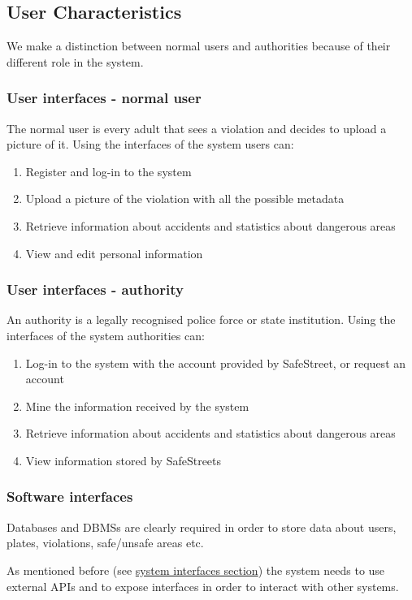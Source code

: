 \subsection{User Characteristics}
	We make a distinction between normal users and authorities because of their different role in the system. 
	\subsubsection{User interfaces - normal user}
	The normal user is every adult that sees a violation and decides to upload a picture of it.
	Using the interfaces of the system users can:
	\begin{enumerate}
		\item Register and log-in to the system
		\item Upload a picture of the violation with all the possible metadata
		\item Retrieve information about accidents and statistics about dangerous areas
		\item View and edit personal information
	\end{enumerate}
	
	\subsubsection{User interfaces - authority}
		An authority is a legally recognised police force or state institution.
		Using the interfaces of the system authorities can:
		\begin{enumerate}
			\item Log-in to the system with the account provided by SafeStreet, or request an account
			\item Mine the information received by the system
			\item Retrieve information about accidents and statistics about dangerous areas
			\item View information stored by SafeStreets
		\end{enumerate}
	
\subsubsection{Software interfaces}
Databases and DBMSs are clearly required in order to store data about users, plates, violations, safe/unsafe areas etc.

As mentioned before (see \hyperref[sec:systemInterfaces]{system interfaces section}) the system needs to use external APIs and to expose interfaces in order to interact with other systems.


